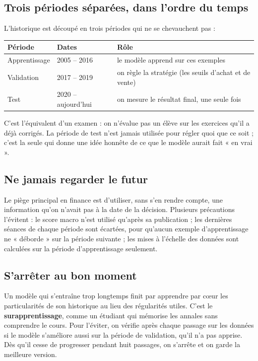\documentclass[11pt,a4paper]{article}
\begin{document}
\subsection{Trois périodes séparées, dans l'ordre du temps}
L'historique est découpé en trois périodes qui ne se chevauchent pas :

\begin{center}
\small
\begin{tabularx}{\linewidth}{@{}l l >{\raggedright\arraybackslash}X@{}}
\toprule
\textbf{Période} & \textbf{Dates} & \textbf{Rôle} \\
\midrule
Apprentissage & 2005 -- 2016 & le modèle apprend sur ces exemples \\
Validation    & 2017 -- 2019 & on règle la stratégie (les seuils d'achat et de vente) \\
Test          & 2020 -- aujourd'hui & on mesure le résultat final, une seule fois \\
\bottomrule
\end{tabularx}
\end{center}

C'est l'équivalent d'un examen : on n'évalue pas un élève sur les exercices qu'il a déjà
corrigés. La période de test n'est jamais utilisée pour régler quoi que ce soit ; c'est
la seule qui donne une idée honnête de ce que le modèle aurait fait « en vrai ».

\subsection{Ne jamais regarder le futur}
Le piège principal en finance est d'utiliser, sans s'en rendre compte, une information
qu'on n'avait pas à la date de la décision. Plusieurs précautions l'évitent : le score
macro n'est utilisé qu'après sa publication ; les dernières séances de chaque période sont
écartées, pour qu'aucun exemple d'apprentissage ne « déborde » sur la période suivante ; les
mises à l'échelle des données sont calculées sur la période d'apprentissage seulement.

\subsection{S'arrêter au bon moment}
Un modèle qui s'entraîne trop longtemps finit par apprendre par cœur les particularités
de son historique au lieu des régularités utiles. C'est le \textbf{surapprentissage}, comme
un étudiant qui mémorise les annales sans comprendre le cours. Pour l'éviter, on vérifie
après chaque passage sur les données si le modèle s'améliore aussi sur la période de
validation, qu'il n'a pas apprise. Dès qu'il cesse de progresser pendant huit passages, on
s'arrête et on garde la meilleure version.
\end{document}
